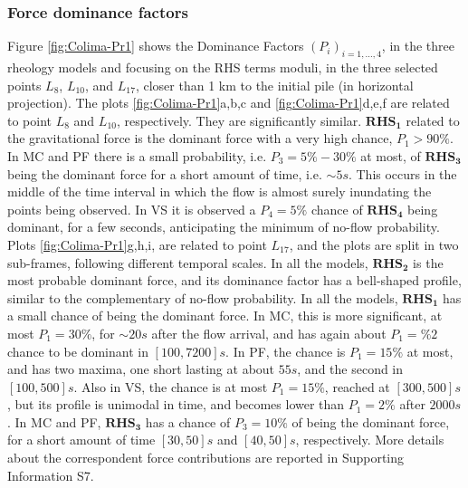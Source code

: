 \documentclass{article}
\begin{document}
\subsubsection{Force dominance factors}\label{stat2}
Figure \ref{fig:Colima-Pr1} shows the Dominance Factors $(P_i)_{i=1,\dots,4}$, in the three rheology models and focusing on the RHS terms moduli, in the three selected points $L_{8}$, $L_{10}$, and $L_{17}$, closer than 1 km to the initial pile (in horizontal projection). The plots \ref{fig:Colima-Pr1}a,b,c and \ref{fig:Colima-Pr1}d,e,f are related to point $L_8$ and $L_{10}$, respectively. They are significantly similar. $\boldsymbol{RHS_1}$ related to the gravitational force is the dominant force with a very high chance, $P_1>90\%$. In MC and PF there is a small probability, i.e. $P_3=5\%-30\%$ at most, of $\boldsymbol{RHS_3}$ being the dominant force for a short amount of time, i.e. $\sim 5 s$. This occurs in the middle of the time interval in which the flow is almost surely inundating the points being observed. In VS it is observed a $P_4=5\%$ chance of $\boldsymbol{RHS_4}$ being dominant, for a few seconds, anticipating the minimum of no-flow probability. Plots \ref{fig:Colima-Pr1}g,h,i, are related to point $L_{17}$, and the plots are split in two sub-frames, following different temporal scales. In all the models, $\boldsymbol{RHS_2}$ is the most probable dominant force, and its dominance factor has a bell-shaped profile, similar to the complementary of no-flow probability. In all the models, $\boldsymbol{RHS_1}$ has a small chance of being the dominant force. In MC, this is more significant, at most $P_1=30\%$, for $\sim 20 s$ after the flow arrival, and has again about $P_1=\%2$ chance to be dominant in $[100, 7200] s$. In PF, the chance is $P_1=15\%$ at most, and has two maxima, one short lasting at about $55 s$, and the second in $[100,500] s$. Also in VS, the chance is at most $P_1=15\%$, reached at $[300, 500] s$, but its profile is unimodal in time, and becomes lower than $P_1=2\%$ after $2000 s$. In MC and PF, $\boldsymbol{RHS_3}$ has a chance of $P_3=10\%$ of being the dominant force, for a short amount of time $[30, 50] s$ and $[40, 50] s$, respectively. More details about the correspondent force contributions are reported in Supporting Information S7.
\end{document}
